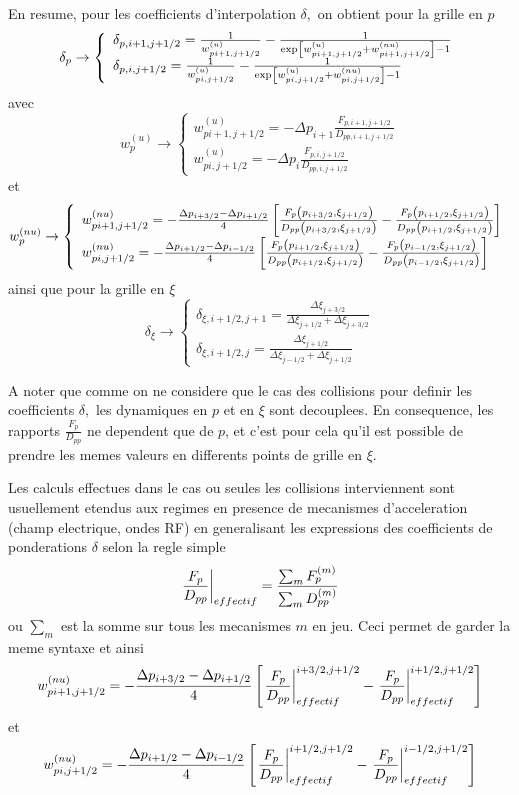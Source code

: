 En resume, pour les coefficients d'interpolation $\delta,$ on obtient pour
la grille en $p$%
\[
\delta_{p}\rightarrow\left\{ 
\begin{array}{l}
\delta_{p,i+1,j+1/2}=\frac{1}{w_{pi+1,j+1/2}^{(u)}}-\frac{1}{%
\exp\left[w_{pi+1,j+1/2}^{(u)}+w_{pi+1,j+1/2}^{(nu)}\right]-1} \\ 
\delta_{p,i,j+1/2}=\frac{1}{w_{pi,j+1/2}^{(u)}}-\frac{1}{\exp%
\left[w_{pi,j+1/2}^{(u)}+w_{pi,j+1/2}^{(nu)}\right]-1}
\end{array}
\right.
\]
avec 
\[
w_{p}^{(u)}\rightarrow\left\{ 
\begin{array}{l}
w_{pi+1,j+1/2}^{(u)}=-\Delta p_{i+1}\frac{F_{p,i+1,j+1/2}}{D_{pp,i+1,j+1/2}}
\\ 
w_{pi,j+1/2}^{(u)}=-\Delta p_{i}\frac{F_{p,i,j+1/2}}{D_{pp,i,j+1/2}}
\end{array}
\right.
\]
et 
\[
w_{p}^{(nu)}\rightarrow\left\{ 
\begin{array}{l}
w_{pi+1,j+1/2}^{(nu)}=-\frac{\Delta p_{i+3/2}-\Delta p_{i+1/2}}{4}\left[%
\frac{F_{p}\left(p_{i+3/2},\xi_{j+1/2}\right)}{D_{pp}\left(p_{i+3/2},%
\xi_{j+1/2}\right)}-\frac{F_{p}\left(p_{i+1/2},\xi_{j+1/2}\right)}{%
D_{pp}\left(p_{i+1/2},\xi_{j+1/2}\right)}\right] \\ 
w_{pi,j+1/2}^{(nu)}=-\frac{\Delta p_{i+1/2}-\Delta p_{i-1/2}}{4}\left[\frac{%
F_{p}\left(p_{i+1/2},\xi_{j+1/2}\right)}{D_{pp}\left(p_{i+1/2},\xi_{j+1/2}%
\right)}-\frac{F_{p}\left(p_{i-1/2},\xi_{j+1/2}\right)}{D_{pp}%
\left(p_{i-1/2},\xi_{j+1/2}\right)}\right]
\end{array}
\right.
\]
ainsi que pour la grille en $\xi$%
\[
\delta_{\xi}\rightarrow\left\{ 
\begin{array}{l}
\delta_{\xi,i+1/2,j+1}=\frac{\Delta\xi_{j+3/2}}{\Delta\xi_{j+1/2}+\Delta%
\xi_{j+3/2}} \\ 
\delta_{\xi,i+1/2,j}=\frac{\Delta\xi_{j+1/2}}{\Delta\xi_{j-1/2}+\Delta%
\xi_{j+1/2}}
\end{array}
\right.
\]

A noter que comme on ne considere que le cas des collisions pour definir les
coefficients $\delta,$ les dynamiques en $p$ et en $\xi$ sont decouplees. En
consequence, les rapports $\frac{F_{p}}{D_{pp}}$ ne dependent que de $p$, et
c'est pour cela qu'il est possible de prendre les memes valeurs en
differents points de grille en $\xi.$

Les calculs effectues dans le cas ou seules les collisions interviennent
sont usuellement etendus aux regimes en presence de mecanismes
d'acceleration (champ electrique, ondes RF) en generalisant les expressions
des coefficients de ponderations $\delta$ selon la regle simple 
\[
\left.\frac{F_{p}}{D_{pp}}\right|_{effectif}=\frac{\sum_{m}F_{p}^{(m)}}{%
\sum_{m}D_{pp}^{(m)}}
\]
ou $\sum_{m}$ est la somme sur tous les mecanismes $m$ en jeu. Ceci permet
de garder la meme syntaxe et ainsi 
\[
w_{pi+1,j+1/2}^{(nu)}=-\frac{\Delta p_{i+3/2}-\Delta p_{i+1/2}}{4}%
\left[\left.\frac{F_{p}}{D_{pp}}\right|_{effectif}^{i+3/2,j+1/2}-\left.\frac{%
F_{p}}{D_{pp}}\right|_{effectif}^{i+1/2,j+1/2}\right]
\]
et 
\[
w_{pi,j+1/2}^{(nu)}=-\frac{\Delta p_{i+1/2}-\Delta p_{i-1/2}}{4}\left[\left.%
\frac{F_{p}}{D_{pp}}\right|_{effectif}^{i+1/2,j+1/2}-\left.\frac{F_{p}}{%
D_{pp}}\right|_{effectif}^{i-1/2,j+1/2}\right]
\]

